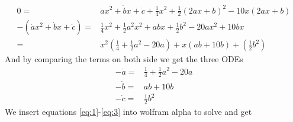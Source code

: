 \documentclass{article}
\begin{document}
\begin{align}
	0 =& \dot{a}x^2 + \dot{b}x + \dot{c} + \frac{1}{4}x^2 + \frac{1}{2}(2ax + b) ^2 - 10x(2ax + b) \\
	-(\dot{a}x^2 + \dot{b}x + \dot{c})=& \frac{1}{4}x^2 + \frac{1}{2}a^2x^2 +abx + \frac{1}{2}b^2 - 20ax^2 + 10bx \\ 
	=& x^2\left( \frac{1}{4}+\frac{1}{2}a^2-20a\right) + x(ab + 10b) + \left( \frac{1}{2} b^2\right) 
\end{align}
And by comparing the terms on both side we get the three ODEs
\begin{align}
	-\dot{a} =& \frac{1}{4}+\frac{1}{2}a^2-20a \label{eq:1}\\
	-\dot{b} =& ab + 10b \label{eq:2}\\
	-\dot{c} =& \frac{1}{2} b^2 \label{eq:3}
\end{align}
We insert equations \ref{eq:1}-\ref{eq:3} into wolfram alpha to solve and get
\end{document}
